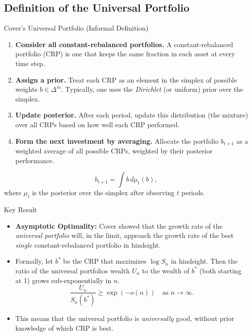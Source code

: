 \documentclass{beamer}
\begin{document}
\begin{small}
\section{Definition of the Universal Portfolio}
\begin{frame}{Cover's Universal Portfolio (Informal Definition)}
  \begin{enumerate}
    \item \textbf{Consider all constant-rebalanced portfolios.} A constant-rebalanced portfolio (CRP) 
          is one that keeps the same fraction in each asset at every time step.
    \item \textbf{Assign a prior.} Treat each CRP as an element in the simplex of possible weights \(b \in \Delta^m\). 
          Typically, one uses the \emph{Dirichlet} (or uniform) prior over the simplex.
    \item \textbf{Update posterior.} After each period, update this distribution (the mixture) over all CRPs 
          based on how well each CRP performed.
    \item \textbf{Form the next investment by averaging.} Allocate the portfolio \(b_{t+1}\) as a weighted average 
          of all possible CRPs, weighted by their posterior performance.
  \end{enumerate}
  \[
    b_{t+1} = \int b \, d\mu_t(b),
  \]
  where \(\mu_t\) is the posterior over the simplex after observing \(t\) periods.
\end{frame}

\begin{frame}{Key Result}
  \begin{itemize}
    \item \textbf{Asymptotic Optimality:} Cover showed that the growth rate of the \emph{universal portfolio} 
          will, in the limit, approach the growth rate of the best \emph{single} constant-rebalanced portfolio 
          in hindsight.
    \item Formally, let \(b^*\) be the CRP that maximizes \(\log S_n\) in hindsight. Then the ratio of 
          the universal portfolios wealth \(U_n\) to the wealth of \(b^*\) (both starting at 1) 
          grows sub-exponentially in \(n\). 
    \[
      \frac{U_n}{S_n(b^*)} \ge \exp(-o(n)) \quad \text{as } n \to \infty.
    \]
    \item This means that the universal portfolio is \emph{universally} good, without prior knowledge 
          of which CRP is best.
  \end{itemize}
\end{frame}


\end{small}
\end{document}
